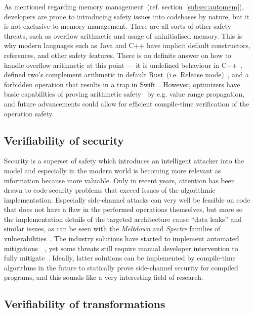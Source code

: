 \documentclass[]{tukportfolio}
\begin{document}
As mentioned regarding memory management~(ref. section~\ref{subsec:automem}), developers are prone to introducing safety issues into codebases by nature, but it is not exclusive to memory management. There are all sorts of other safety threats, such as overflow arithmetic and usage of uninitialised memory. This is why modern languages such as Java and C++ have implicit default constructors, references, and other safety features. There is no definite answer on how to handle overflow arithmetic at this point --- it is undefined behaviour in C++~\cite{10.5555/2543987}, defined two's complement arithmetic in default Rust~(i.e. Release mode)~\cite{rustops}, and a forbidden operation that results in a trap in Swift~\cite{swiftops}. However, optimizers have basic capabilities of proving arithmetic safety~\cite{llvmundef} by e.g. value range propagation, and future advancements could allow for efficient compile-time verification of the operation safety.

\subsection{Verifiability of security}

Security is a superset of safety which introduces an intelligent attacker into the model and especially in the modern world is becoming more relevant as information because more valuable. Only in recent years, attention has been drawn to code security problems that exceed issues of the algorithmic implementation. Especially side-channel attacks can very well be feasible on code that does not have a flaw in the performed operations themselves, but more so the implementation details of the targeted architecture cause ``data leaks'' and similar issues, as can be seen with the \textit{Meltdown} and \textit{Spectre} families of vulnerabilities~\cite{8835233}.
The industry solutions have started to implement automated mitigations~\cite{llvmspectre}~\cite{msvcspectre}, yet some threats still require manual developer intervention to fully mitigate~\cite{251530}. Ideally, latter solutions can be implemented by compile-time algorithms in the future to statically prove side-channel security for compiled programs, and this sounds like a very interesting field of research.

\subsection{Verifiability of transformations}
\end{document}
